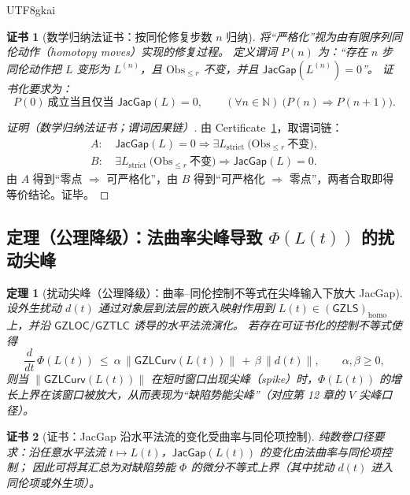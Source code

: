 \documentclass[12pt]{article}
\newtheorem{theorem}{定理}[section]
\newtheorem{certificate}{证书}[section]
\newcommand{\GZLS}{\ensuremath{\mathsf{GZLS}}}
\newcommand{\GZLOC}{\ensuremath{\mathsf{GZLOC}}}
\newcommand{\GZLCurv}{\ensuremath{\mathsf{GZLCurv}}}
\newcommand{\GZTLC}{\ensuremath{\mathsf{GZTLC}}}
\newcommand{\JacGap}{\ensuremath{\mathsf{JacGap}}}
\begin{document}
\begin{CJK*}{UTF8}{gkai}
\begin{certificate}[数学归纳法证书：按同伦修复步数 $n$ 归纳]
\label{cert:jacgap-strictification-induction}
将“严格化”视为由有限序列同伦动作（homotopy moves）实现的修复过程。
定义谓词 $P(n)$ 为：“存在 $n$ 步同伦动作把 $L$ 变形为 $L^{(n)}$，且 $\mathrm{Obs}_{\le r}$ 不变，并且 $\JacGap(L^{(n)})=0$”。
证书化要求为：
\[
P(0)\ \text{成立当且仅当 }\JacGap(L)=0,\qquad
(\forall n\in\mathbb{N})\ \bigl(P(n)\Rightarrow P(n+1)\bigr).
\]
\end{certificate}

\begin{proof}[证明（数学归纳法证书；谓词因果链）]
由 Certificate~\ref{cert:jacgap-strictification-induction}，取谓词链：
\[
\begin{aligned}
A:&\ \JacGap(L)=0\Rightarrow \exists L_{\mathrm{strict}}\ \bigl(\mathrm{Obs}_{\le r}\ \text{不变}\bigr),\\
B:&\ \exists L_{\mathrm{strict}}\ \bigl(\mathrm{Obs}_{\le r}\ \text{不变}\bigr)\Rightarrow \JacGap(L)=0.
\end{aligned}
\]
由 $A$ 得到“零点 $\Rightarrow$ 可严格化”，由 $B$ 得到“可严格化 $\Rightarrow$ 零点”，两者合取即得等价结论。证毕。
\end{proof}

\subsection{定理（公理降级）：法曲率尖峰导致 $\Phi(L(t))$ 的扰动尖峰}

\begin{theorem}[扰动尖峰（公理降级）：曲率–同伦控制不等式在尖峰输入下放大 JacGap]
\label{thm:law-curvature-spike-jacgap}
设外生扰动 $d(t)$ 通过对象层到法层的嵌入映射作用到 $L(t)\in(\GZLS)_{\mathrm{homo}}$ 上，并沿 $\GZLOC/\GZTLC$ 诱导的水平法流演化。
若存在可证书化的控制不等式使得
\[
\frac{d}{dt}\,\Phi(L(t))
\ \le\
\alpha\,\|\GZLCurv(L(t))\|
\,+\,
\beta\,\|d(t)\|,
\qquad \alpha,\beta\ge 0,
\]
则当 $\|\GZLCurv(L(t))\|$ 在短时窗口出现尖峰（spike）时，$\Phi(L(t))$ 的增长上界在该窗口被放大，从而表现为“缺陷势能尖峰”（对应第 12 章的 $V$ 尖峰口径）。
\end{theorem}

\begin{certificate}[证书：JacGap 沿水平法流的变化受曲率与同伦项控制]
\label{cert:jacgap-controlled-by-curvature}
纯数卷口径要求：沿任意水平法流 $t\mapsto L(t)$，$\JacGap(L(t))$ 的变化由法曲率与同伦项控制；
因此可将其汇总为对缺陷势能 $\Phi$ 的微分不等式上界（其中扰动 $d(t)$ 进入同伦项或外生项）。
\end{certificate}


\end{CJK*}
\end{document}
